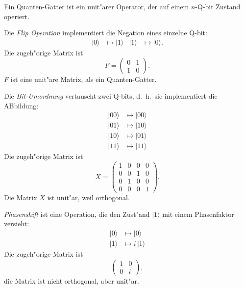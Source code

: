 \begin{definition}
Ein Quanten-Gatter ist ein unit"arer Operator, der auf einem 
$n$-Q-bit Zustand operiert.
\end{definition}

\begin{beispiel}
Die {\em Flip Operation} implementiert die Negation eines einzelne Q-bit:
\begin{align*}
|0\rangle&\mapsto |1\rangle & |1\rangle&\mapsto |0\rangle.
\end{align*}
Die zugeh"orige Matrix ist
\[
F=\begin{pmatrix}
0&1\\
1&0
\end{pmatrix}.
\]
$F$ ist eine unit"are Matrix, als ein Quanten-Gatter.
\end{beispiel}

\begin{beispiel}
Die {\em Bit-Umordnung} vertauscht zwei Q-bits, d.~h.~sie implementiert
die ABbildung:
\begin{align*}
|00\rangle&\mapsto |00\rangle\\
|01\rangle&\mapsto |10\rangle\\
|10\rangle&\mapsto |01\rangle\\
|11\rangle&\mapsto |11\rangle
\end{align*}
Die zugeh"orige Matrix ist
\[
X=
\begin{pmatrix}
1&0&0&0\\
0&0&1&0\\
0&1&0&0\\
0&0&0&1
\end{pmatrix}.
\]
Die Matrix $X$ ist unit"ar, weil orthogonal.
\end{beispiel}

\begin{beispiel}
{\em Phasenshift} ist eine Operation, die den Zust"and $|1\rangle$ 
mit einem Phasenfaktor versieht:
\begin{align*}
|0\rangle &\mapsto |0\rangle\\
|1\rangle &\mapsto i\,|1\rangle
\end{align*}
Die zugeh"orige Matrix ist
\[
\begin{pmatrix}
1&0\\
0&i
\end{pmatrix},
\]
die Matrix ist nicht orthogonal, aber unit"ar.
\end{beispiel}

